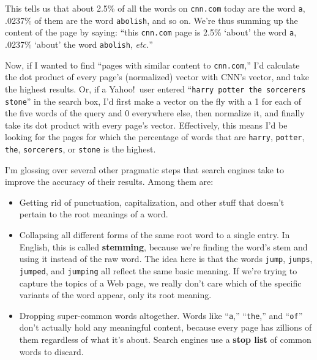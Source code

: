 \begin{alttitles}
This tells us that about 2.5\% of all the words on \texttt{cnn.com} today are
the word \texttt{a}, .0237\% of them are the word \texttt{abolish}, and so on.
We're thus summing up the content of the page by saying: ``this
\texttt{cnn.com} page is 2.5\% `about' the word \texttt{a}, .0237\% `about' the
word \texttt{abolish}, \textit{etc.}''

Now, if I wanted to find ``pages with similar content to \texttt{cnn.com},''
I'd calculate the dot product of every page's (normalized) vector with CNN's
vector, and take the highest results. Or, if a Yahoo!~user entered
``\texttt{harry potter the sorcerers stone}'' in the search box, I'd first make
a vector on the fly with a 1 for each of the five words of the query and 0
everywhere else, then normalize it, and finally take its dot product with every
page's vector. Effectively, this means I'd be looking for the pages for which
the percentage of words that are \texttt{harry}, \texttt{potter}, \texttt{the},
\texttt{sorcerers}, or \texttt{stone} is the highest.

\medskip

I'm glossing over several other pragmatic steps that search engines take to
improve the accuracy of their results. Among them are:

\vspace{-.1in}
\begin{itemize}

\item Getting rid of punctuation, capitalization, and other stuff that doesn't
pertain to the root meanings of a word.


\item Collapsing all different forms of the same root word to a single entry.
In English, this is called \textbf{stemming}, because we're finding the word's
stem and using it instead of the raw word. The idea here is that the words
\texttt{jump}, \texttt{jumps}, \texttt{jumped}, and \texttt{jumping} all
reflect the same basic meaning. If we're trying to capture the topics of a Web
page, we really don't care which of the specific variants of the word appear,
only its root meaning.


\item Dropping super-common words altogether. Words like ``\texttt{a},''
``\texttt{the},'' and ``\texttt{of}'' don't actually hold any meaningful
content, because every page has zillions of them regardless of what it's about.
Search engines use a \textbf{stop list} of common words to discard.


\end{itemize}
\end{alttitles}
